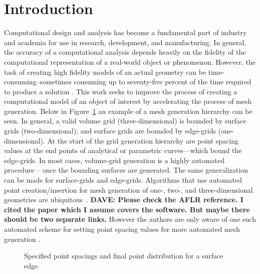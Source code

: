 \section{Introduction}Computational design and analysis has become a 
fundamental part of industry and academia for use in research, 
development, and manufacturing. In general, the accuracy of a 
computational analysis depends heavily on the fidelity of the 
computational representation of a real-world object or phenomenon. 
However, the task of creating high fidelity models of an actual geometry 
can be time-consuming--sometimes consuming up to seventy-five percent of 
the time required to produce a solution \cite{bischoff05}. This work seeks 
to improve the process of creating a computational model of an object of 
interest by accelerating the process of mesh generation. Below in 
Figure~\ref{GridGenerationProcess} an example of a mesh generation 
hierarchy can be seen. In general, a valid volume grid (three-dimensional) 
is bounded by surface grids (two-dimensional); and surface grids are 
bounded by edge-grids (one-dimensional). At the start of the grid 
generation hierarchy are point spacing values at the end points of 
analytical or parametric curves—which bound the edge-grids. In most cases, 
volume-grid generation is a highly automated procedure -- once the 
bounding surfaces are generated. The same generalization can be made for 
surface-grids and edge-grids. Algorithms that use automated point 
creation/insertion for mesh generation of one-, two-, and 
three-dimensional geometries are ubiquitous~\cite{cubit,delaunay,aflr}.
{\bf{DAVE:  Please check the AFLR reference.  I cited the paper which
I assume covers the software.  But maybe there should be two separate
links.}}  However the authors are only aware of one such automated scheme 
for setting point spacing values for more automated mesh generation \cite{mclaurin12}.\\

\begin{figure}[h!]
 \caption{\label{GridGenerationProcess} Specified point spacings and final point distribution for a surface edge \cite{thompson98}}
\end{figure}

